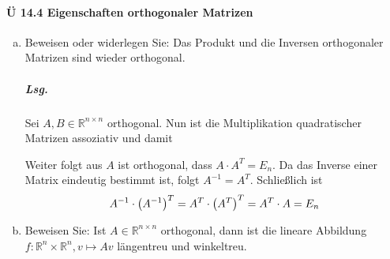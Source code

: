 \documentclass{scrreprt}
\begin{document}
\paragraph{Ü 14.4 Eigenschaften orthogonaler Matrizen}
\begin{enumerate}[(a)]
\item Beweisen oder widerlegen Sie: Das Produkt und die Inversen orthogonaler
  Matrizen sind wieder orthogonal.

  \subparagraph{Lsg.} Sei $A, B \in \mathbb{R}^{n \times n}$ orthogonal.
  Nun ist die Multiplikation quadratischer Matrizen assoziativ und damit

  Weiter folgt aus $A$ ist orthogonal, dass $A \cdot A^T = E_n$.
  Da das Inverse einer Matrix eindeutig bestimmt ist, folgt $A^{-1} = A^T$.
  Schließlich ist
  \[
    A^{-1} \cdot \qty(A^{-1})^T = A^T \cdot \qty(A^T)^T = A^T \cdot A = E_n
  \]

\item Beweisen Sie: Ist $A \in \mathbb{R}^{n \times n}$ orthogonal, dann ist die
  lineare Abbildung $f \colon \mathbb{R}^n \times \mathbb{R}^n, v \mapsto Av$
  längentreu und winkeltreu.


\end{enumerate}
\end{document}
